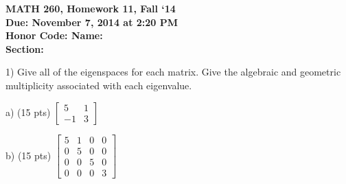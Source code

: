 \documentclass{article}
\begin{document}
\begin{flushleft}
	\bfseries{MATH 260, Homework 11, Fall `14}\\
	\bfseries{Due: November 7, 2014 at 2:20 PM}\\
	\bfseries{Honor Code:} \hspace{3.5in}\bfseries{Name:}\\
	\hspace{4.37in}\bfseries{Section:}
\end{flushleft}
\begin{flushleft}
\vspace{.25in}

1) Give all of the eigenspaces for each matrix.  Give the algebraic and geometric multiplicity associated with each eigenvalue.

\vspace{0.2in}

a) (15 pts) $\begin{bmatrix} 5&1\\-1&3 \end{bmatrix}$

\pagebreak

b) (15 pts) $\begin{bmatrix} 5&1&0&0\\0&5&0&0\\0&0&5&0\\0&0&0&3 \end{bmatrix}$

\pagebreak

\end{flushleft}
\end{document}
